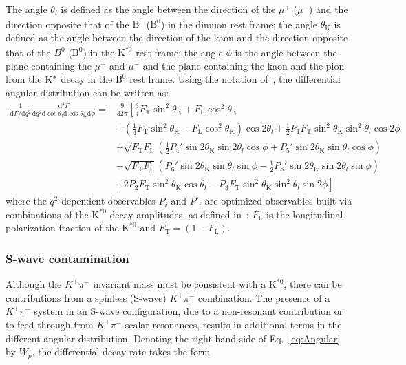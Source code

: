 The angle $\theta_l$ is defined as the angle between the direction of the $\mu^+ $ ($\mu^- $) and the direction opposite that of the $\text{B}^0$ ($\bar{\text{B}^0}$) in the dimuon rest frame; the angle $\theta_\mathrm{K} $ is defined as the angle between the direction of the kaon and the direction opposite that of the $B^0$ ($\bar{\text{B}^0}$) in the $\text{K}^{*0}$ rest frame; the angle $\phi$ is the angle between the plane containing the $\mu^+ $ and $\mu^- $ and the plane containing the kaon and the pion from the $\textrm{K}^\ast$ decay in the $\text{B}^0$ rest frame.
Using the notation of~\cite{Ball2009}, the differential angular distribution can be written as:
\begin{equation} \label{eq:Angular}
    \begin{split}
        \frac{1}{\mathrm{d}\Gamma/\mathrm{d}q^2}\frac{\mathrm{d}^4\Gamma}{\mathrm{d}q^2 \mathrm{d}\cos\theta_l \mathrm{d}\cos\theta_\mathrm{K} \mathrm{d}\phi} =&\frac{9}{32\pi}\left[\frac{3}{4}F_\mathrm{T}\sin^2\theta_\mathrm{K} + F_\mathrm{L}\cos^2\theta_\mathrm{K} \right.\\
            &\left.+\left(\frac{1}{4}F_\mathrm{T}\sin^2\theta_\mathrm{K}-F_\mathrm{L}\cos^2\theta_\mathrm{K}\right)\cos2\theta_l+\frac{1}{2}P_1F_\mathrm{T}\sin^2\theta_\mathrm{K}\sin^2\theta_l\cos 2\phi \right.\\
            &+\sqrt{F_\mathrm{T}F_\mathrm{L}}\left(\frac{1}{2}P_4'\sin2\theta_\mathrm{K}\sin2\theta_l\cos\phi+P_5'\sin2\theta_\mathrm{K}\sin\theta_l\cos\phi \right)\\
            &-\sqrt{F_\mathrm{T}F_\mathrm{L}}\left(P_6'\sin2\theta_\mathrm{K}\sin\theta_l\sin\phi-\frac{1}{2}P_8'\sin2\theta_\mathrm{K}\sin2\theta_l\sin\phi \right)\\
            &\left.+2P_2F_\mathrm{T}\sin^2\theta_\mathrm{K}\cos\theta_l-P_3F_\mathrm{T}\sin^2\theta_\mathrm{K}\sin^2\theta_l\sin2\phi \right]
    \end{split}
\end{equation}
where the $q^2$ dependent observables $P_i$ and $P'_i$ are optimized observables built via 
combinations of the $\text{K}^{*0}$ decay amplitudes, as defined in~\cite{Genon:Swave};
$F_\mathrm{L}$ is the longitudinal polarization fraction of the $\text{K}^{*0}$ and
$F_\mathrm{T}=(1-F_\mathrm{L})$.
\subsubsection{S-wave contamination}
\label{sec:S-waveform}
Although the $K^+\pi^-$ invariant mass must be consistent with a
$\text{K}^{*0}$, there can be contributions from a spinless (S-wave)
$K^+\pi^-$ combination. The presence of a $K^+\pi^-$
system in an S-wave configuration, due to a non-resonant contribution or
to feed through from $K^+\pi^-$ scalar resonances, results in additional
terms in the different angular distribution. Denoting the right-hand side
 of Eq.~\ref{eq:Angular} by $W_p$, the differential decay rate takes the form

